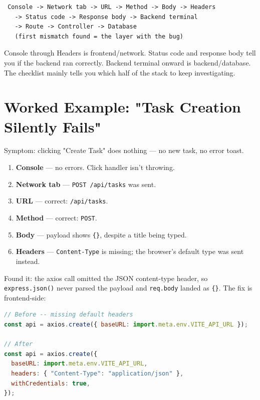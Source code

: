 \begin{diagrambox}
\begin{verbatim}
 Console -> Network tab -> URL -> Method -> Body -> Headers
   -> Status code -> Response body -> Backend terminal
   -> Route -> Controller -> Database
   (first mismatch found = the layer with the bug)
\end{verbatim}
\end{diagrambox}

\begin{notebox}[NOTE]
Console through Headers is frontend/network. Status code and response body
tell you if the backend ran correctly. Backend terminal onward is
backend/database. The checklist mainly tells you which half of the stack
to keep investigating.
\end{notebox}

\section{Worked Example: "Task Creation Silently Fails"}

Symptom: clicking "Create Task" does nothing --- no new task, no error
toast.

\begin{enumerate}
\item \textbf{Console} --- no errors. Click handler isn't throwing.
\item \textbf{Network tab} --- \texttt{POST /api/tasks} was sent.
\item \textbf{URL} --- correct: \texttt{/api/tasks}.
\item \textbf{Method} --- correct: \texttt{POST}.
\item \textbf{Body} --- payload shows \texttt{\{\}}, despite a title being typed.
\item \textbf{Headers} --- \texttt{Content-Type} is missing; the browser's default type was sent instead.
\end{enumerate}

Found it: the axios call omitted the JSON content-type header, so
\texttt{express.json()} never parsed the payload and \texttt{req.body}
landed as \texttt{\{\}}. The fix is frontend-side:

\begin{lstlisting}[language=JavaScript]
// Before -- missing default headers
const api = axios.create({ baseURL: import.meta.env.VITE_API_URL });

// After
const api = axios.create({
  baseURL: import.meta.env.VITE_API_URL,
  headers: { "Content-Type": "application/json" },
  withCredentials: true,
});
\end{lstlisting}

